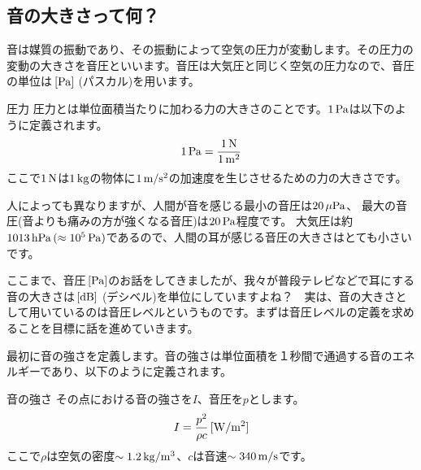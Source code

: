 \documentclass[11pt,b5paper,papersize,dvipdfmx]{jsbook}
\begin{document}
\subsection{音の大きさって何？}
音は媒質の振動であり、その振動によって空気の圧力が変動します。その圧力の変動の大きさを音圧といいます。音圧は大気圧と同じく空気の圧力なので、音圧の単位は$\tani*{Pa}$ (パスカル)を用います。
\begin{itembox}[l]{圧力}
  圧力とは単位面積当たりに加わる力の大きさのことです。$1\tani{Pa}$は以下のように定義されます。
  \begin{align}
    1\tani{Pa}=\frac{1\tani{N}}{1\tani{m^2}}
  \end{align}
  ここで$1\tani{N}$は$1\tani{kg}$の物体に$1\tani{m/s^2}$の加速度を生じさせるための力の大きさです。
\end{itembox}\par
人によっても異なりますが、人間が音を感じる最小の音圧は$20\tani{\mu Pa}$、
最大の音圧(音よりも痛みの方が強くなる音圧)は$20\tani{Pa}$程度です。
大気圧は約$1013\tani{hPa} \,(\approx 10^5\tani{Pa})$であるので、人間の耳が感じる音圧の大きさはとても小さいです。\par
ここまで、音圧$\tani*{Pa}$のお話をしてきましたが、我々が普段テレビなどで耳にする音の大きさは$\tani*{dB}$ (デシベル)を単位にしていますよね？　実は、音の大きさとして用いているのは音圧レベルというものです。まずは音圧レベルの定義を求めることを目標に話を進めていきます。\par
最初に音の強さを定義します。音の強さは単位面積を１秒間で通過する音のエネルギーであり、以下のように定義されます。
\begin{itembox}[l]{音の強さ}
  その点における音の強さを$I$、音圧を$p$とします。
  \begin{align}
    I=\frac{p^2}{\rho c} \tani*{W/m^2}\label{fig:ototuyosa}
  \end{align}
  ここで$\rho$は空気の密度$\sim 1.2\tani{kg/m^3}$、$c$は音速$\sim 340\tani{m/s}$です。
\end{itembox}
\end{document}
